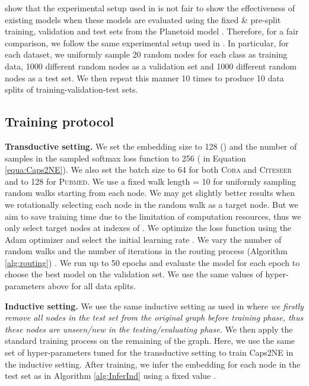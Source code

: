 \documentclass[sigconf]{acmart}
\begin{document}
\citet{duran2017learning} show that the experimental setup used in \citep{kipf2017semi,velickovic2018graph} is not fair to show the effectiveness of existing models when these models are evaluated using the fixed \& pre-split training, validation and test sets from the Planetoid model \citep{Yang:2016planetoid}.
Therefore, for a fair comparison, we follow the same experimental setup used in \citep{duran2017learning,Nguyen2019SANNE}. 
In particular, for each dataset, we uniformly sample 20 random nodes for each class as training data, 1000 different random nodes as a validation set and 1000 different random nodes as a test set.
We then repeat this manner 10 times to produce 10 data splits of training-validation-test sets.

\subsection{Training protocol}
\label{subsec:train}

\textbf{Transductive setting.} We set the embedding size  to 128 () and the number of samples in the sampled softmax loss function to 256 ( in Equation \ref{equa:Caps2NE}).
We also set the batch size to 64 for both \textsc{Cora} and \textsc{Citeseer} and to 128 for \textsc{Pubmed}.
We use a fixed walk length  = 10 for uniformly sampling  random walks starting from each node.
We may get slightly better results when we rotationally selecting each node in the random walk as a target node. 
But we aim to save training time due to the limitation of computation resources, thus we only select target nodes at indexes of .
We optimize the loss function using the Adam optimizer \citep{kingma2014adam} and select the initial learning rate .
We vary the number  of random walks   and the number  of iterations in the routing process (Algorithm \ref{alg:routing}) .
We run up to 50 epochs and evaluate the model for each epoch to choose the best model on the validation set.
We use the same values of hyper-parameters above for all data splits.


\textbf{Inductive setting.} We use the same inductive setting as used in  \citep{Yang:2016planetoid,duran2017learning} where \textit{we firstly remove all nodes in the test set from the original graph before training phase, thus these nodes  are unseen/new in the testing/evaluating phase.} We then apply the standard training process on the remaining of the graph. 
Here, we use the same set of hyper-parameters tuned for the transductive setting to train Caps2NE in the inductive setting.
After training, we infer the embedding for each node  in the test set as  in Algorithm \ref{alg:InferInd} using a fixed value .
\end{document}
